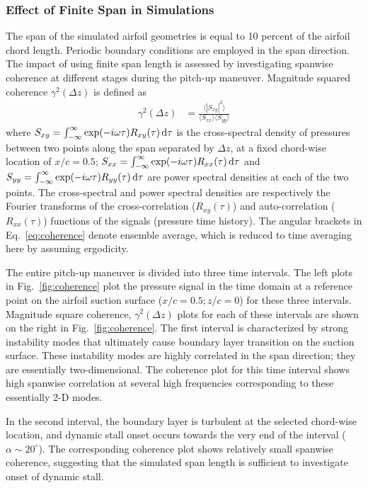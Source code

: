 \documentclass[aps,pra,preprint,groupedaddress]{revtex4-1}
\newcommand{\abs}[1]{\left| #1 \right|} %
\renewcommand{\=}[1]{\stackrel{#1}{=}} %
\begin{document}
\subsubsection{Effect of Finite Span in Simulations}
\label{sec:coherence}
%
The span of the simulated airfoil geometries is equal to 10 percent of the
airfoil chord length. Periodic boundary conditions are employed in the span
direction. The impact of using finite span length is assessed by investigating
spanwise coherence at different stages during the pitch-up maneuver. Magnitude
squared coherence $\gamma^2(\Delta z)$ is defined as
%
\begin{align}
  \gamma^2(\Delta z) &= \frac{\langle \abs{S_{xy}}^2 \rangle}{\langle S_{xx}\rangle \langle S_{yy} \rangle}
  \label{eq:coherence}
\end{align}
%
where $S_{xy}=\int_{-\infty}^{\infty} \exp(-i \omega \tau) R_{xy}(\tau)\,{\rm
d} \tau$ is the cross-spectral density of pressures between two points along
the span separated by $\Delta z$, at a fixed chord-wise location of $x/c=0.5$;
$S_{xx} = \int_{-\infty}^{\infty} \exp(-i \omega \tau) R_{xx}(\tau)\,{\rm d}
\tau$ and $S_{yy} = \int_{-\infty}^{\infty} \exp(-i \omega \tau) R_{yy}(\tau)
\,{\rm d} \tau$ are power spectral densities at each of the two points.  The
cross-spectral and power spectral densities are respectively the Fourier
transforms of the cross-correlation ($R_{xy}(\tau)$) and auto-correlation
($R_{xx}(\tau)$) functions of the signals (pressure time history). The angular
brackets in Eq.~\ref{eq:coherence} denote ensemble average, which is reduced to
time averaging here by assuming ergodicity.

The entire pitch-up maneuver is divided into three time intervals. The left
plots in Fig.~\ref{fig:coherence} plot the pressure signal in the time domain
at a reference point on the airfoil suction surface ($x/c=0.5; z/c=0$) for
these three intervals. Magnitude square coherence, $\gamma^2(\Delta z)$ plots
for each of these intervals are shown on the right in Fig.~\ref{fig:coherence}.
The first interval is characterized by strong instability modes that ultimately
cause boundary layer transition on the suction surface. These instability modes
are highly correlated in the span direction; they are essentially
two-dimensional. The coherence plot for this time interval shows high spanwise
correlation at several high frequencies corresponding to these essentially 2-D
modes.

In the second interval, the boundary layer is turbulent at the selected
chord-wise location, and dynamic stall onset occurs towards the very end
of the interval ($\alpha \sim 20^\circ$). The corresponding coherence plot shows
relatively small spanwise coherence, suggesting that the simulated span length
is sufficient to investigate onset of dynamic stall.
\end{document}
